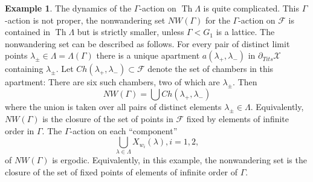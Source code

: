 \documentclass[12pt]{amsbook}%
\theoremstyle{definition}
\newtheorem{example}[thm]{Example}
\theoremstyle{remark}
\numberwithin{section}{chapter}
\numberwithin{subsection}{section}
\numberwithin{figure}{chapter}
\DeclareMathOperator{\Th}{Th}
\def\tits{\partial_{Tits}}
\def\cF{{\mathscr{F}}}
\def\cX{{\mathscr{X}}}
\def\Ga{\Gamma}
\def\La{\Lambda}
\def\la{\lambda}
\begin{document}
{{\begin{example}
The dynamics of the $\Ga$-action on $\Th\La$ is quite complicated. This $\Ga$-action  is not proper, the nonwandering set $NW(\Ga)$ for the $\Ga$-action on $\cF$ is contained in $\Th\La$ but is strictly smaller, unless 
$\Ga< G_1$ is a lattice. The nonwandering set can be described as follows. For every pair of distinct limit points $\la_\pm\in \La=\La(\Ga)$ there is a unique apartment $a(\la_+, \la_-)$ in $\tits \cX$ containing $\la_\pm$. Let $Ch(\la_+,\la_-)\subset \cF$ denote  the set of chambers in this apartment: There are six such chambers, two of which are $\la_\pm$. Then
$$
NW(\Ga)= \bigcup Ch(\la_+,\la_-)
$$
where the union is taken over all pairs of distinct elements $\la_\pm \in \La$. Equivalently, $NW(\Ga)$ is the closure of the set of points in $\cF$ fixed by elements of infinite order in $\Ga$. The $\Ga$-action on each ``component'' 
$$
\bigcup_{\la\in \La} X_{w_i}(\la), i=1, 2,$$
of $NW(\Ga)$ is ergodic. Equivalently, in this example, the nonwandering set is the closure of the set of fixed points of elements of infinite order of $\Ga$.  
\end{example} 

}}
\end{document}
